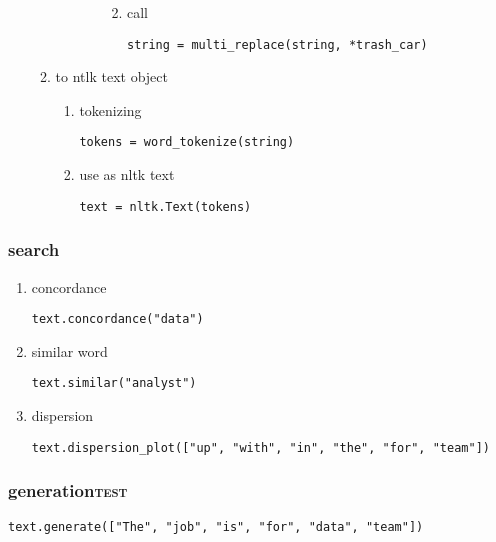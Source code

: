\documentclass[11pt]{article}
\begin{document}
\begin{enumerate}
\begin{enumerate}
\begin{enumerate}
\begin{enumerate}
\begin{enumerate}
\begin{verbatim}
\end{verbatim}

\item call
\label{sec:org4ed0c9f}
\begin{verbatim}
string = multi_replace(string, *trash_car)
\end{verbatim}
\end{enumerate}
\end{enumerate}
\end{enumerate}


\item to ntlk text object
\label{sec:orgf0eb58e}
\begin{enumerate}
\item tokenizing
\label{sec:orgbd0ebcc}
\begin{verbatim}
tokens = word_tokenize(string)
\end{verbatim}

\item use as nltk text
\label{sec:org12f2b6e}
\begin{verbatim}
text = nltk.Text(tokens)
\end{verbatim}
\end{enumerate}
\end{enumerate}
\end{enumerate}
\subsubsection{search}
\label{sec:org6da83f8}
\begin{enumerate}
\item concordance
\label{sec:orgc2acf44}
\begin{verbatim}
text.concordance("data")
\end{verbatim}
\item similar word
\label{sec:org351d6ba}
\begin{verbatim}
text.similar("analyst")
\end{verbatim}
\item dispersion
\label{sec:orgce88d4f}
\begin{verbatim}
text.dispersion_plot(["up", "with", "in", "the", "for", "team"])
\end{verbatim}
\end{enumerate}
\subsubsection{generation\hfill{}\textsc{test}}
\label{sec:org0108c10}
\begin{verbatim}
text.generate(["The", "job", "is", "for", "data", "team"])
\end{verbatim}
\end{document}
